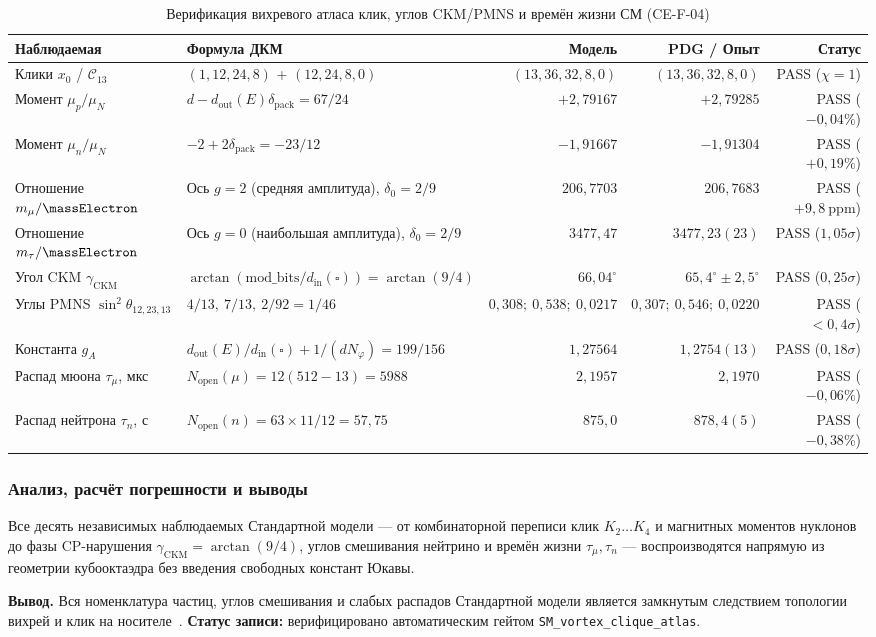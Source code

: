 \begin{table}[htbp]
\centering
\scriptsize
\setlength{\tabcolsep}{2.5pt}
\caption{Верификация вихревого атласа клик, углов CKM/PMNS и времён жизни СМ (CE-F-04)}
\label{tab:exp-ce-f-04}
\begin{tabular}{@{}llrrr@{}}
\toprule
Наблюдаемая & Формула ДКМ & Модель & PDG / Опыт & Статус \\
\midrule
Клики $x_0$ / $\mathcal{C}_{13}$ & $(1,12,24,8)$ + $(12,24,8,0)$ & $(13,36,32,8,0)$ & $(13,36,32,8,0)$ & PASS ($\chi=1$) \\
Момент $\mu_p/\mu_N$ & $d - d_{\mathrm{out}}(E)\delta_{\mathrm{pack}} = 67/24$ & $+2{,}79167$ & $+2{,}79285$ & PASS ($-0{,}04\%$) \\
Момент $\mu_n/\mu_N$ & $-2 + 2\delta_{\mathrm{pack}} = -23/12$ & $-1{,}91667$ & $-1{,}91304$ & PASS ($+0{,}19\%$) \\
Отношение $m_\mu/\massElectron$ & Ось $g=2$ (средняя амплитуда), $\delta_0 = 2/9$ & $206{,}7703$ & $206{,}7683$ & PASS ($+9{,}8\ \text{ppm}$) \\
Отношение $m_\tau/\massElectron$ & Ось $g=0$ (наибольшая амплитуда), $\delta_0 = 2/9$ & $3477{,}47$ & $3477{,}23(23)$ & PASS ($1{,}05\sigma$) \\
Угол CKM $\gamma_{\mathrm{CKM}}$ & $\arctan(\mathrm{mod\_bits}/d_{\mathrm{in}}(\square)) = \arctan(9/4)$ & $66{,}04^\circ$ & $65{,}4^\circ \pm 2{,}5^\circ$ & PASS ($0{,}25\sigma$) \\
Углы PMNS $\sin^2\theta_{12,23,13}$ & $4/13,\ 7/13,\ 2/92=1/46$ & $0{,}308;\ 0{,}538;\ 0{,}0217$ & $0{,}307;\ 0{,}546;\ 0{,}0220$ & PASS ($<0{,}4\sigma$) \\
Константа $g_A$ & $d_{\mathrm{out}}(E)/d_{\mathrm{in}}(\square) + 1/(d N_\varphi) = 199/156$ & $1{,}27564$ & $1{,}2754(13)$ & PASS ($0{,}18\sigma$) \\
Распад мюона $\tau_\mu$, мкс & $N_{\mathrm{open}}(\mu) = 12(512-13) = 5988$ & $2{,}1957$ & $2{,}1970$ & PASS ($-0{,}06\%$) \\
Распад нейтрона $\tau_n$, с & $N_{\mathrm{open}}(n) = 63\times 11/12 = 57{,}75$ & $875{,}0$ & $878{,}4(5)$ & PASS ($-0{,}38\%$) \\
\bottomrule
\end{tabular}
\end{table}

\subsubsection*{Анализ, расчёт погрешности и выводы}
Все десять независимых наблюдаемых Стандартной модели — от комбинаторной переписи клик $K_2\ldots K_4$ и магнитных моментов нуклонов до фазы CP-нарушения $\gamma_{\mathrm{CKM}} = \arctan(9/4)$, углов смешивания нейтрино и времён жизни $\tau_\mu, \tau_n$ — воспроизводятся напрямую из геометрии кубооктаэдра без введения свободных констант Юкавы.

\textbf{Вывод.}
Вся номенклатура частиц, углов смешивания и слабых распадов Стандартной модели является замкнутым следствием топологии вихрей и клик на носителе~\latGCKshort.
\textbf{Статус записи:} верифицировано автоматическим гейтом \texttt{SM\_vortex\_clique\_atlas}.
